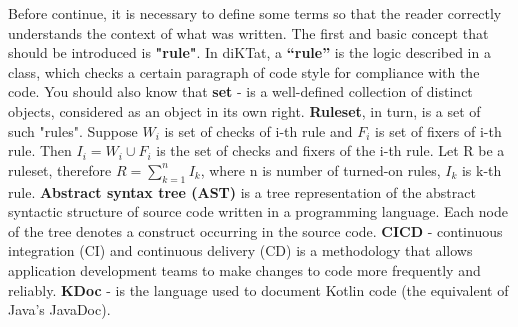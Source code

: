 Before continue, it is necessary to define some terms so that the reader correctly understands the context of what was written. 
The first and basic concept that should be introduced is \textbf{"rule"}. In diKTat, a \textbf{“rule”} is the logic described in a class, which checks a certain paragraph of code style for compliance with the code.
 You should also know that \textbf{set} -  is a well-defined collection of distinct objects, considered as an object in its own right. 
 \textbf{Ruleset}, in turn, is a set of such "rules". Suppose $W_i$ is set of checks of i-th rule and $F_i$ is set of fixers of i-th rule. Then $I_i = W_i \cup F_i $ is the set of checks and fixers of the i-th rule. Let R be a ruleset, therefore $R = \sum_{k=1}^n I_k$, where n is number of turned-on rules, $I_k$ is k-th rule.
 \textbf{Abstract syntax tree (AST)} is a tree representation of the abstract syntactic structure of source code written in a programming language. Each node of the tree denotes a construct occurring in the source code.
 \textbf{CICD} - continuous integration (CI) and continuous delivery (CD) is a methodology that allows application development teams to make changes to code more frequently and reliably.
 \textbf{KDoc} - is the language used to document Kotlin code (the equivalent of Java's JavaDoc).